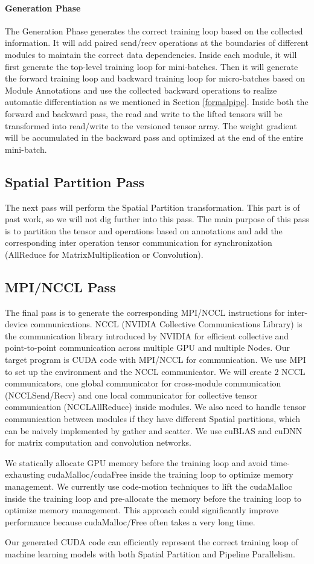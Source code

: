 \documentclass[sigplan, nonacm]{acmart}\settopmatter{printfolios=true,printccs=false,printacmref=false}
\begin{document}
\paragraph{Generation Phase}
The Generation Phase generates the correct training loop based on the collected information. It will add paired send/recv operations at the boundaries of different modules to maintain the correct data dependencies. Inside each module, it will first generate the top-level training loop for mini-batches. Then it will generate the forward training loop and backward training loop for micro-batches based on Module Annotations and use the collected backward operations to realize automatic differentiation as we mentioned in Section \ref{formalpipe}. Inside both the forward and backward pass, the read and write to the lifted tensors will be transformed into read/write to the versioned tensor array. The weight gradient will be accumulated in the backward pass and optimized at the end of the entire mini-batch.\par
\subsection{Spatial Partition Pass}
The next pass will perform the Spatial Partition transformation. This part is of past work, so we will not dig further into this pass. The main purpose of this pass is to partition the tensor and operations based on annotations and add the corresponding inter operation tensor communication for synchronization (AllReduce for MatrixMultiplication or Convolution).\par
\subsection{MPI/NCCL Pass}
The final pass is to generate the corresponding MPI/NCCL instructions for inter-device communications. NCCL (NVIDIA Collective Communications Library) is the communication library introduced by NVIDIA for efficient collective and point-to-point communication across multiple GPU and multiple Nodes. Our target program is CUDA code with MPI/NCCL for communication. We use MPI to set up the environment and the NCCL communicator. We will create 2 NCCL communicators, one global communicator for cross-module communication (NCCLSend/Recv) and one local communicator for collective tensor communication (NCCLAllReduce) inside modules. We also need to handle tensor communication between modules if they have different Spatial partitions, which can be naively implemented by gather and scatter. We use cuBLAS and cuDNN for matrix computation and convolution networks.\par
We statically allocate GPU memory before the training loop and avoid time-exhausting cudaMalloc/cudaFree inside the training loop to optimize memory management. We currently use code-motion techniques to lift the cudaMalloc inside the training loop and pre-allocate the memory before the training loop to optimize memory management. This approach could significantly improve performance because cudaMalloc/Free often takes a very long time.\par
Our generated CUDA code can efficiently represent the correct training loop of machine learning models with both Spatial Partition and Pipeline Parallelism.
\end{document}
